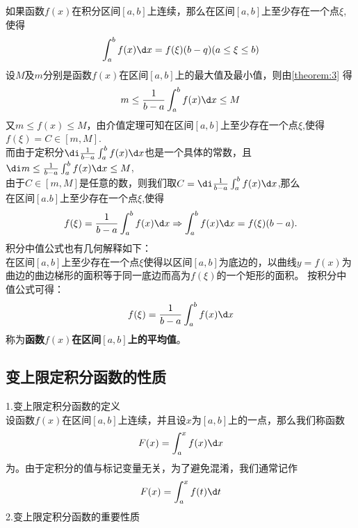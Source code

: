 \sj
\theorem[积分中值定理]
如果函数$f(x)$在积分区间$[a,b]$上连续，那么在区间$[a,b]$上至少存在一个点$\xi$,使得
\begin{equation}
	\int_{a}^{b}f(x)\d x=f(\xi)(b-q)(a\leq\xi\leq b)
\end{equation}
\proof 设$M$及$m$分别是函数$f(x)$在区间$[a,b]$上的最大值及最小值，则由\ref{theorem:3}\hspace*{0.3em} 得
\begin{equation}
	\nonumber
	m\leq\frac{1}{b-a}\int_{a}^{b}f(x)\d x\leq M
\end{equation}
又$m\leq f(x)\leq M$，由介值定理可知在区间$[a,b]$上至少存在一个点$\xi$,使得$f(\xi)=C\in[m,M]$.\vspace{0.5em}\\
而由于定积分$\di\frac{1}{b-a}\int_{a}^{b}f(x)\d x$也是一个具体的常数，且$\di m\leq\frac{1}{b-a}\int_{a}^{b}f(x)\d x\leq M$,\\
由于$C\in [m,M]$是任意的数，则我们取$C=\di\frac{1}{b-a}\int_{a}^{b}f(x)\d x$,那么\\
在区间$[a.b]$上至少存在一个点$\xi$,使得
\begin{equation}
	\nonumber
	f(\xi)=\frac{1}{b-a}\int_{a}^{b}f(x)\d x \Rightarrow \int_{a}^{b}f(x)\d x=f(\xi)(b-a).
\end{equation}
\kg 积分中值公式也有几何解释如下：\\
\kg 在区间$[a,b]$上至少存在一个点$\xi$使得以区间$[a,b]$为底边的，以曲线$y=f(x)$为曲边的曲边梯形的面积等于同一底边而高为$f(\xi)$的一个矩形的面积。
\kg 按积分中值公式可得：
\begin{equation}
	\nonumber
f(\xi)=\frac{1}{b-a}\int_{a}^{b}f(x)\d x
\end{equation}
称为\textbf{函数$f(x)$在区间$[a,b]$上的平均值}。
\subsection{变上限定积分函数的性质}
\noindent 1.变上限定积分函数的定义\\
\kg 设函数$f(x)$在区间$[a,b]$上连续，并且设$x$为$[a,b]$上的一点，那么我们称函数
\begin{equation}
	F(x)=\int_{a}^{x}f(x)\d x
\end{equation}
为。由于定积分的值与标记变量无关，为了避免混淆，我们通常记作
\begin{equation}
	F(x)=\int_{a}^{x}f(t)\d t
\end{equation}
2.变上限定积分函数的重要性质\\

